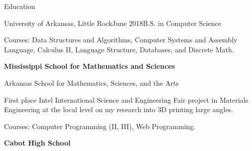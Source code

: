 \documentclass{resume} %
\begin{document}

\begin{rSection}{Education}

\begin{rSubsection}{University of Arkansas, Little Rock}{June 2018}{B.S. in Computer Science}

	\item Courses: Data Structures and Algorithms, Computer Systems and Assembly Language, Calculus II, Language Structure, Databases, and Discrete Math.
\end{rSubsection}

{\bf Mississippi School for Mathematics and Sciences}

\begin{rSubsection}{Arkansas School for Mathematics, Sciences, and the Arts}{}{}

	\item First place Intel International Science and Engineering Fair project in Materials Engineering at the local level on my research into 3D printing large angles.
	\item Courses: Computer Programming (II, III), Web Programming.
\end{rSubsection}

{\bf Cabot High School}

\end{rSection}
\end{document}
